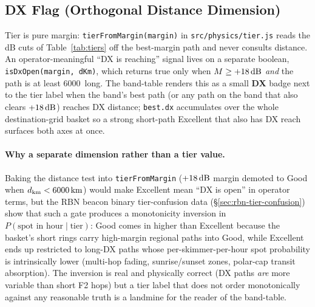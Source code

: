 \documentclass[11pt,a4paper]{article}
\newcommand{\SI}[2]{#1\,\text{#2}}
\newcommand{\si}[1]{\text{#1}}
\newcommand{\dB}{\text{dB}}
\newcommand{\km}{\text{km}}
\begin{document}
\subsection{DX Flag (Orthogonal Distance Dimension)}\label{sec:dxflag}

Tier is pure margin: \texttt{tierFromMargin(margin)} in
\texttt{src/physics/tier.js} reads the dB cuts of
Table~\ref{tab:tiers} off the best-margin path and never
consults distance.  An operator-meaningful ``DX is reaching''
signal lives on a separate boolean,
\texttt{isDxOpen(margin, dKm)}, which returns true only when
$M \geq +18\,\si{\dB}$ \emph{and} the path is at least
\SI{6000}{\km} long.  The band-table renders this as a small
\textbf{DX} badge next to the tier label when the band's best
path (or any path on the band that also clears
$+18\,\si{\dB}$) reaches DX distance; \texttt{best.dx}
accumulates over the whole destination-grid basket so a strong
short-path
Excellent that also has DX reach surfaces both axes at once.

\paragraph{Why a separate dimension rather than a tier value.}
Baking the distance test into
\texttt{tierFromMargin} ($+18\,\si{\dB}$ margin demoted to Good
when $d_{\text{km}} < \SI{6000}{\km}$) would make Excellent
mean ``DX is open'' in operator terms, but the RBN
beacon binary tier-confusion data
(\S\ref{sec:rbn-tier-confusion}) show that such a gate produces
a monotonicity inversion in
$P(\text{spot in hour} \mid \text{tier})$: Good comes in
higher than Excellent because the basket's short rings carry
high-margin regional paths into Good, while Excellent ends up
restricted to long-DX paths whose per-skimmer-per-hour spot
probability is intrinsically lower (multi-hop fading,
sunrise/sunset zones, polar-cap transit absorption).  The
inversion is real and physically correct (DX paths \emph{are}
more variable than short F2 hops) but a tier label that does
not order monotonically against any reasonable truth is a
landmine for the reader of the band-table.
\end{document}
